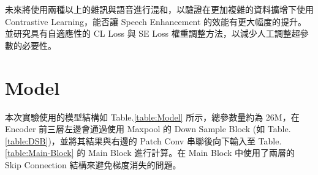 \documentclass[10pt,twocolumn,letterpaper]{article}
\begin{document}
\begin{CJK}{UTF8}{bkai}
   未來將使用兩種以上的雜訊與語音進行混和，以驗證在更加複雜的資料擴增下使用 Contrastive
   Learning，能否讓 Speech Enhancement 的效能有更大幅度的提升。並研究具有自適應性的
   CL Loss 與 SE Loss 權重調整方法，以減少人工調整超參數的必要性。

   {\small
   
   
   }
   \newpage

   \appendix
   \section{Model}
   本次實驗使用的模型結構如 Table.\ref{table:Model} 所示，總參數量約為 26M，在 Encoder 前三層左邊會通過使用 Maxpool 的
   Down Sample Block (如 Table.\ref{table:DSB})，並將其結果與右邊的 Patch Conv 串聯後向下輸入至 Table.\ref{table:Main-Block} 的 Main Block
   進行計算。在 Main Block 中使用了兩層的 Skip Connection 結構來避免梯度消失的問題。


\end{CJK}
\end{document}
